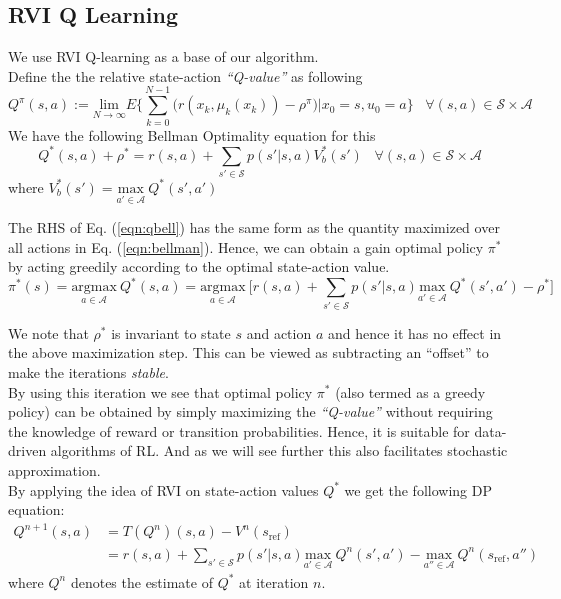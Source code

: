\documentclass{article}
\theoremstyle{definition}
\begin{document}
\subsection{RVI Q Learning}
We use RVI Q-learning \cite{borkarbertsekas} as a
base of our algorithm.\\
Define the the relative state-action \textit{``Q-value''} as following\\
\begin{equation}
    \label{eqn:qvalue}
    Q^{\pi}(s,a) := \underset{N\rightarrow\infty}{\text{lim}} E\Big\{\sum_{k=0}^{N-1}\Big(r(x_k,\mu_k(x_k))-\rho^\pi\Big)|x_0=s,u_0=a\Big\} \hspace{10pt} \forall (s,a)\in \mathcal{S}\times\mathcal{A} 
\end{equation}
We have the following Bellman Optimality equation for this
\begin{equation}
\label{eqn:qbell}
    Q^*(s,a)+\rho^* = r(s,a)+\sum_{s'\in\mathcal{S}}p(s'|s,a)V_b^*(s') \hspace{10pt} \forall (s,a)\in \mathcal{S}\times\mathcal{A} 
\end{equation}
where $V_b^*(s') = \underset{a'\in\mathcal{A}}{\text{max}}\ Q^*(s',a')$

The RHS of Eq. (\ref{eqn:qbell}) has the same form as the quantity maximized over all actions in Eq. (\ref{eqn:bellman}). Hence, we can obtain a gain optimal policy $\pi^*$ by acting greedily according to the optimal state-action value.
\[\pi^*(s) = \underset{a\in\mathcal{A}}{\text{argmax}} \ Q^*(s,a) =\underset{a\in\mathcal{A}}{\text{argmax}} \ \Big[r(s,a)+\sum_{s'\in\mathcal{S}}p(s'|s,a)\underset{a'\in\mathcal{A}}{\text{max}}\ Q^*(s',a')-\rho^*\Big] \]

We note that $\rho^*$ is invariant to state $s$ and action $a$ and hence it has no effect in the above maximization step. This can be viewed as subtracting an ``offset'' to make the iterations \textit{stable}.\\

By using this iteration we see that optimal policy $\pi^*$ (also termed as a greedy policy) can be obtained by simply maximizing the \textit{``Q-value''} without requiring the knowledge of reward or transition probabilities. Hence, it is suitable for data-driven algorithms of RL. And as we will see further this also facilitates stochastic approximation.\\

By applying the idea of RVI on state-action values $Q^*$ we get the following DP equation:  
\begin{align*}
    Q^{n+1}(s,a) &= T(Q^n)(s,a)-V^n(s_{\text{ref}})  \\
    &= r(s,a)+\sum_{s'\in\mathcal{S}}p(s'|s,a)\underset{a'\in\mathcal{A}}{\text{max}}\ Q^n(s',a')-\underset{a''\in\mathcal{A}}{\text{max}}\ Q^n(s_{\text{ref}},a'') 
\end{align*}
where $Q^n$ denotes the estimate of $Q^*$ at iteration $n$.\\
\end{document}
